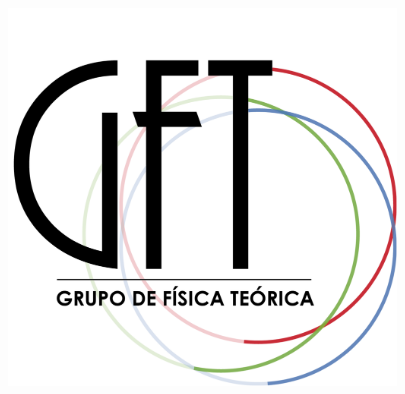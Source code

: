 \documentclass[a0,portrait]{a0poster}
\begin{document}
%
\begin{minipage}[b]{0.15\linewidth}
\includegraphics[height=10cm]{gft.pdf}\\
\end{minipage}


\vspace{.5cm} %

\end{document}

